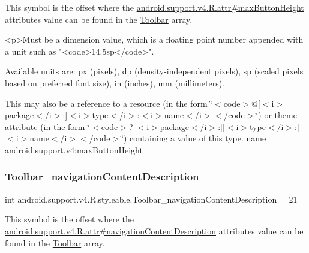 This symbol is the offset where the \hyperlink{classandroid_1_1support_1_1v4_1_1R_1_1attr_a1e32c821f0577ed221f1e619a58ef17b}{android.\+support.\+v4.\+R.\+attr\#max\+Button\+Height} attribute\textquotesingle{}s value can be found in the \hyperlink{classandroid_1_1support_1_1v4_1_1R_1_1styleable_a211358a2f951023c7735caea0fb5ae04}{Toolbar} array.

\begin{DoxyVerb}      <p>Must be a dimension value, which is a floating point number appended with a unit such as "<code>14.5sp</code>".
\end{DoxyVerb}
 Available units are\+: px (pixels), dp (density-\/independent pixels), sp (scaled pixels based on preferred font size), in (inches), mm (millimeters). 

This may also be a reference to a resource (in the form \char`\"{}$<$code$>$@\mbox{[}$<$i$>$package$<$/i$>$\+:\mbox{]}$<$i$>$type$<$/i$>$\+:$<$i$>$name$<$/i$>$$<$/code$>$\char`\"{}) or theme attribute (in the form \char`\"{}$<$code$>$?\mbox{[}$<$i$>$package$<$/i$>$\+:\mbox{]}\mbox{[}$<$i$>$type$<$/i$>$\+:\mbox{]}$<$i$>$name$<$/i$>$$<$/code$>$\char`\"{}) containing a value of this type.  name android.\+support.\+v4\+:max\+Button\+Height \mbox{\label{classandroid_1_1support_1_1v4_1_1R_1_1styleable_a6160a902fc7264d07ae23eb1d7d2e966}} 
\subsubsection{\texorpdfstring{Toolbar\+\_\+navigation\+Content\+Description}{Toolbar\_navigationContentDescription}}
{\footnotesize\ttfamily int android.\+support.\+v4.\+R.\+styleable.\+Toolbar\+\_\+navigation\+Content\+Description = 21\hspace{0.3cm}{\ttfamily [static]}}

This symbol is the offset where the \hyperlink{classandroid_1_1support_1_1v4_1_1R_1_1attr_ae8b1add32bd7b6f2205c9f7569130ffa}{android.\+support.\+v4.\+R.\+attr\#navigation\+Content\+Description} attribute\textquotesingle{}s value can be found in the \hyperlink{classandroid_1_1support_1_1v4_1_1R_1_1styleable_a211358a2f951023c7735caea0fb5ae04}{Toolbar} array.


